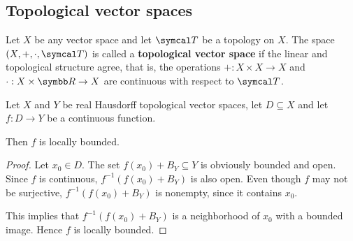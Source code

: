 \subsection{Topological vector spaces}\label{sec:topological_vector_spaces}

\begin{definition}\label{def:topological_vector_space}
  Let \( X \) be any vector space and let \( \Cal{T} \) be a topology on \( X \). The space \( (X, +, \cdot, \Cal{T}) \) is called a \textbf{topological vector space} if the linear and topological structure agree, that is, the operations \( +: X \times X \to X \) and \( \cdot: X \times \BB{R} \to X \) are continuous with respect to \( \Cal{T} \).
\end{definition}

\begin{proposition}\label{thm:continuous_implies_locally_bounded}
  Let \( X \) and \( Y \) be real Hausdorff topological vector spaces, let \( D \subseteq X \) and let \( f: D \to Y \) be a continuous function.

  Then \( f \) is locally bounded.
\end{proposition}
\begin{proof}
  Let \( x_0 \in D \). The set \( f(x_0) + B_Y \subseteq Y \) is obviously bounded and open. Since \( f \) is continuous, \( f^{-1}(f(x_0) + B_Y) \) is also open. Even though \( f \) may not be surjective, \( f^{-1}(f(x_0) + B_Y) \) is nonempty, since it contains \( x_0 \).

  This implies that \( f^{-1}(f(x_0) + B_Y) \) is a neighborhood of \( x_0 \) with a bounded image. Hence \( f \) is locally bounded.
\end{proof}
